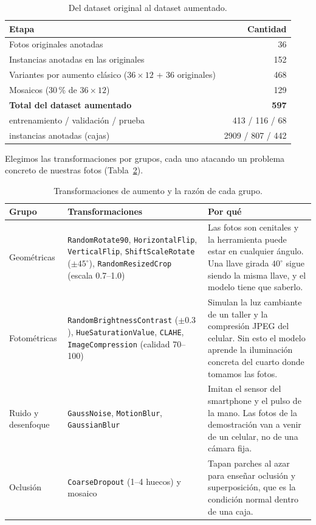 \documentclass[11pt,a4paper]{article}
\begin{document}
\begin{table}[htbp]
\centering
\caption{Del dataset original al dataset aumentado.}
\label{tab:aumento}
\small
\begin{tabular}{@{}lr@{}}
\toprule
\textbf{Etapa} & \textbf{Cantidad} \\
\midrule
Fotos originales anotadas & 36 \\
Instancias anotadas en las originales & 152 \\
Variantes por aumento clásico ($36 \times 12$ + 36 originales) & 468 \\
Mosaicos (30\,\% de $36 \times 12$) & 129 \\
\midrule
\textbf{Total del dataset aumentado} & \textbf{597} \\
\quad entrenamiento / validación / prueba & 413 / 116 / 68 \\
\quad instancias anotadas (cajas) & 2909 / 807 / 442 \\
\bottomrule
\end{tabular}
\end{table}

Elegimos las transformaciones por grupos, cada uno atacando un problema concreto de nuestras fotos
(Tabla~\ref{tab:transforms}).

\begin{table}[htbp]
\centering
\caption{Transformaciones de aumento y la razón de cada grupo.}
\label{tab:transforms}
\small
\begin{tabularx}{\textwidth}{@{}l >{\raggedright\arraybackslash}p{4.6cm} X@{}}
\toprule
\textbf{Grupo} & \textbf{Transformaciones} & \textbf{Por qué} \\
\midrule
Geométricas &
\texttt{RandomRotate90}, \texttt{HorizontalFlip}, \texttt{VerticalFlip},
\texttt{ShiftScaleRotate} ($\pm 45^\circ$), \texttt{RandomResizedCrop} (escala 0.7--1.0) &
Las fotos son cenitales y la herramienta puede estar en cualquier ángulo. Una llave girada
$40^\circ$ sigue siendo la misma llave, y el modelo tiene que saberlo. \\
\addlinespace
Fotométricas &
\texttt{RandomBrightnessContrast} ($\pm 0.3$), \texttt{HueSaturationValue}, \texttt{CLAHE},
\texttt{ImageCompression} (calidad 70--100) &
Simulan la luz cambiante de un taller y la compresión JPEG del celular. Sin esto el modelo aprende
la iluminación concreta del cuarto donde tomamos las fotos. \\
\addlinespace
Ruido y desenfoque &
\texttt{GaussNoise}, \texttt{MotionBlur}, \texttt{GaussianBlur} &
Imitan el sensor del smartphone y el pulso de la mano. Las fotos de la demostración van a venir de
un celular, no de una cámara fija. \\
\addlinespace
Oclusión &
\texttt{CoarseDropout} (1--4 huecos) y mosaico &
Tapan parches al azar para enseñar oclusión y superposición, que es la condición normal dentro de
una caja. \\
\bottomrule
\end{tabularx}
\end{table}
\end{document}
